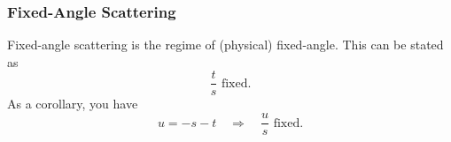 \subsubsection{Fixed-Angle Scattering}
Fixed-angle scattering is the regime of (physical) fixed-angle. This can be stated as
\begin{equation}
	\frac{t}{s} \text{ fixed}.
\end{equation}
As a corollary, you have
\begin{equation}
	u = - s - t \quad \Longrightarrow \quad \frac{u}{s} \text{ fixed}.
\end{equation}